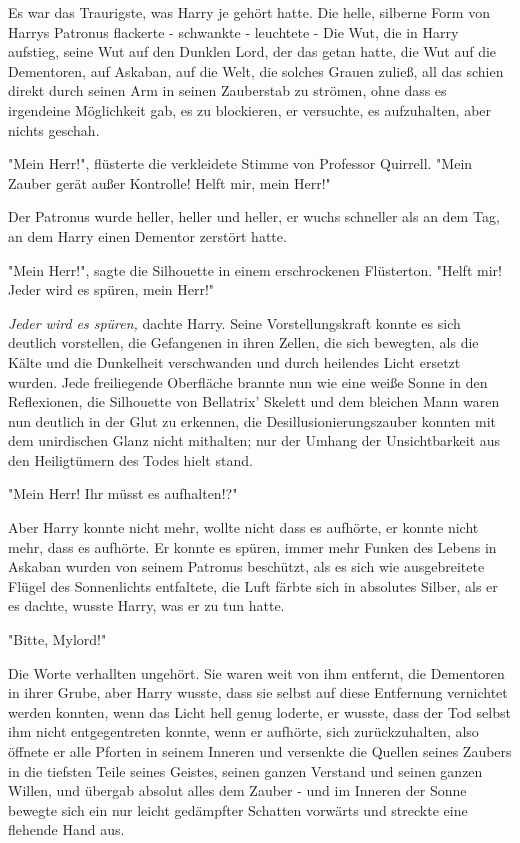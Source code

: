 {Es war das Traurigste, was Harry je gehört hatte. Die helle, silberne Form von Harrys Patronus flackerte - schwankte - leuchtete - Die Wut, die in Harry aufstieg, seine Wut auf den Dunklen Lord, der das getan hatte, die Wut auf die Dementoren, auf Askaban, auf die Welt, die solches Grauen zuließ, all das schien direkt durch seinen Arm in seinen Zauberstab zu strömen, ohne dass es irgendeine Möglichkeit gab, es zu blockieren, er versuchte, es aufzuhalten, aber nichts geschah.

"Mein Herr!", flüsterte die verkleidete Stimme von Professor Quirrell. "Mein Zauber gerät außer Kontrolle! Helft mir, mein Herr!"

Der Patronus wurde heller, heller und heller, er wuchs schneller als an dem Tag, an dem Harry einen Dementor zerstört hatte.

"Mein Herr!", sagte die Silhouette in einem erschrockenen Flüsterton. "Helft mir! Jeder wird es spüren, mein Herr!"

\emph{Jeder wird es spüren,} dachte Harry. Seine Vorstellungskraft konnte es sich deutlich vorstellen, die Gefangenen in ihren Zellen, die sich bewegten, als die Kälte und die Dunkelheit verschwanden und durch heilendes Licht ersetzt wurden. Jede freiliegende Oberfläche brannte nun wie eine weiße Sonne in den Reflexionen, die Silhouette von Bellatrix' Skelett und dem bleichen Mann waren nun deutlich in der Glut zu erkennen, die Desillusionierungszauber konnten mit dem unirdischen Glanz nicht mithalten; nur der Umhang der Unsichtbarkeit aus den Heiligtümern des Todes hielt stand.

"Mein Herr! Ihr müsst es aufhalten!?"

Aber Harry konnte nicht mehr, wollte nicht dass es aufhörte, er konnte nicht mehr, dass es aufhörte. Er konnte es spüren, immer mehr Funken des Lebens in Askaban wurden von seinem Patronus beschützt, als es sich wie ausgebreitete Flügel des Sonnenlichts entfaltete, die Luft färbte sich in absolutes Silber, als er es dachte, wusste Harry, was er zu tun hatte.

"Bitte, Mylord!"

Die Worte verhallten ungehört. Sie waren weit von ihm entfernt, die Dementoren in ihrer Grube, aber Harry wusste, dass sie selbst auf diese Entfernung vernichtet werden konnten, wenn das Licht hell genug loderte, er wusste, dass der Tod selbst ihm nicht entgegentreten konnte, wenn er aufhörte, sich zurückzuhalten, also öffnete er alle Pforten in seinem Inneren und versenkte die Quellen seines Zaubers in die tiefsten Teile seines Geistes, seinen ganzen Verstand und seinen ganzen Willen, und übergab absolut alles dem Zauber - und im Inneren der Sonne bewegte sich ein nur leicht gedämpfter Schatten vorwärts und streckte eine flehende Hand aus.\\

}
